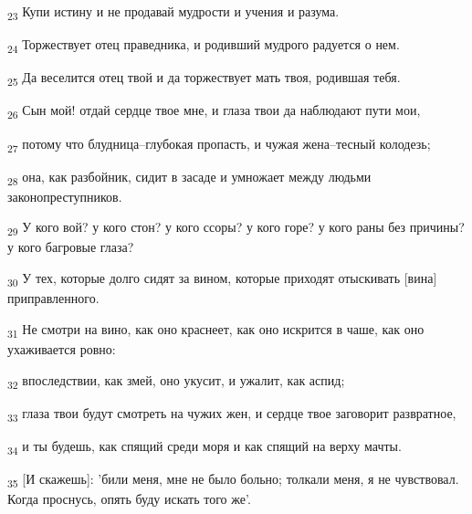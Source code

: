 \begin{tcolorbox}
\textsubscript{23} Купи истину и не продавай мудрости и учения и разума.
\end{tcolorbox}
\begin{tcolorbox}
\textsubscript{24} Торжествует отец праведника, и родивший мудрого радуется о нем.
\end{tcolorbox}
\begin{tcolorbox}
\textsubscript{25} Да веселится отец твой и да торжествует мать твоя, родившая тебя.
\end{tcolorbox}
\begin{tcolorbox}
\textsubscript{26} Сын мой! отдай сердце твое мне, и глаза твои да наблюдают пути мои,
\end{tcolorbox}
\begin{tcolorbox}
\textsubscript{27} потому что блудница--глубокая пропасть, и чужая жена--тесный колодезь;
\end{tcolorbox}
\begin{tcolorbox}
\textsubscript{28} она, как разбойник, сидит в засаде и умножает между людьми законопреступников.
\end{tcolorbox}
\begin{tcolorbox}
\textsubscript{29} У кого вой? у кого стон? у кого ссоры? у кого горе? у кого раны без причины? у кого багровые глаза?
\end{tcolorbox}
\begin{tcolorbox}
\textsubscript{30} У тех, которые долго сидят за вином, которые приходят отыскивать [вина] приправленного.
\end{tcolorbox}
\begin{tcolorbox}
\textsubscript{31} Не смотри на вино, как оно краснеет, как оно искрится в чаше, как оно ухаживается ровно:
\end{tcolorbox}
\begin{tcolorbox}
\textsubscript{32} впоследствии, как змей, оно укусит, и ужалит, как аспид;
\end{tcolorbox}
\begin{tcolorbox}
\textsubscript{33} глаза твои будут смотреть на чужих жен, и сердце твое заговорит развратное,
\end{tcolorbox}
\begin{tcolorbox}
\textsubscript{34} и ты будешь, как спящий среди моря и как спящий на верху мачты.
\end{tcolorbox}
\begin{tcolorbox}
\textsubscript{35} [И скажешь]: 'били меня, мне не было больно; толкали меня, я не чувствовал. Когда проснусь, опять буду искать того же'.
\end{tcolorbox}
